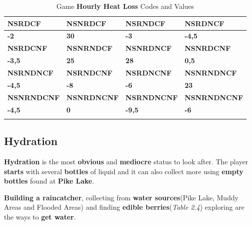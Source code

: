 		\begin{longtable}{|C{8em}|C{8em}|C{8em}|C{8em}|}
			   \toprule
			     \textbf{NSRDCF} & \textbf{NSNRDCF} & \textbf{NSRNDCF} & \textbf{NSRDNCF} \\
			    \midrule
			     \textbf{-2} & \textbf{30} & \textbf{-3} & \textbf{-4,5} \\
			    \midrule
			     \textbf{NSRDCNF} & \textbf{NSNRNDCF} & \textbf{NSNRDNCF} & \textbf{NSNRDCNF} \\
			    \midrule
			     \textbf{-3,5} & \textbf{25} & \textbf{28} & \textbf{0,5} \\
			    \midrule
			     \textbf{NSRNDNCF} & \textbf{NSRNDCNF} & \textbf{NSRDNCNF} & \textbf{NSNRNDNCF} \\
			    \midrule
			     \textbf{-4,5} & \textbf{-8} & \textbf{-6} & \textbf{23} \\
			    \midrule
			     \textbf{NSNRNDCNF} & \textbf{NSNRDNCNF} & \textbf{NSRNDNCNF} & \textbf{NSNRNDNCNF} \\
			    \midrule
			     \textbf{-4,5} & \textbf{0} & \textbf{-9,5} & \textbf{-6} \\
			    \bottomrule
				\caption{Game \textbf{Hourly Heat Loss} Codes and Values}
		 \end{longtable}
		
		\subsection{Hydration}
			\par \textbf{Hydration} is the most \textbf{obvious} and \textbf{mediocre} status to look after. The player \textbf{starts} with several \textbf{bottles} of liquid and it can also collect more using \textbf{empty bottles} found at \textbf{Pike Lake}.
			\par \textbf{Building a raincatcher}, collecting from \textbf{water sources}(Pike Lake, Muddy Areas and Flooded Areas) and finding \textbf{edible berries}(\textit{Table 2.4}) exploring are the ways to \textbf{get water}.
			
